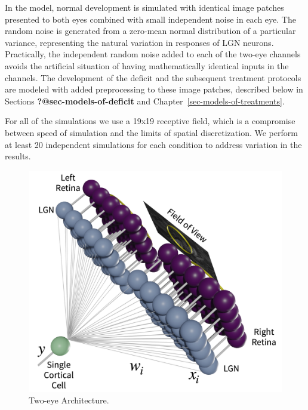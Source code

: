 \documentclass[
  letterpaper,
  DIV=11,
  numbers=noendperiod]{scrreprt}
\begin{document}
In the model, normal development is simulated with identical image
patches presented to both eyes combined with small independent noise in
each eye. The random noise is generated from a zero-mean normal
distribution of a particular variance, representing the natural
variation in responses of LGN neurons. Practically, the independent
random noise added to each of the two-eye channels avoids the artificial
situation of having mathematically identical inputs in the channels. The
development of the deficit and the subsequent treatment protocols are
modeled with added preprocessing to these image patches, described below
in Sections \textbf{?@sec-models-of-deficit} and
Chapter~\ref{sec-models-of-treatments}.

For all of the simulations we use a 19x19 receptive field, which is a
compromise between speed of simulation and the limits of spatial
discretization. We perform at least 20 independent simulations for each
condition to address variation in the results.

\begin{figure}

{\centering \includegraphics{./resources/arch.pdf}

}

\caption{\label{fig-arch}Two-eye Architecture.}

\end{figure}
\end{document}
